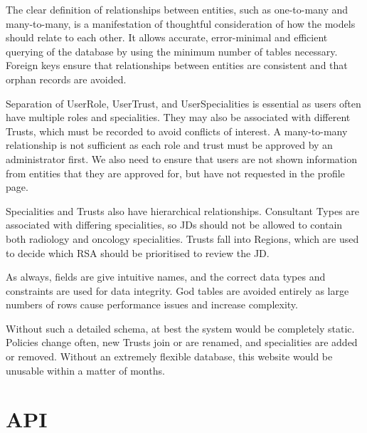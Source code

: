 The clear definition of relationships between entities, such as one-to-many and many-to-many, is a manifestation of thoughtful consideration of how the models should relate to each other. It allows accurate, error-minimal and efficient querying of the database by using the minimum number of tables necessary. Foreign keys ensure that relationships between entities are consistent and that orphan records are avoided.

Separation of UserRole, UserTrust, and UserSpecialities is essential as users often have multiple roles and specialities. They may also be associated with different Trusts, which must be recorded to avoid conflicts of interest. A many-to-many relationship is not sufficient as each role and trust must be approved by an administrator first. We also need to ensure that users are not shown information from entities that they are approved for, but have not requested in the profile page. 

Specialities and Trusts also have hierarchical relationships. Consultant Types are associated with differing specialities, so JDs should not be allowed to contain both radiology and oncology specialities. Trusts fall into Regions, which are used to decide which RSA should be prioritised to review the JD.

As always, fields are give intuitive names, and the correct data types and constraints are used for data integrity. God tables are avoided entirely as large numbers of rows cause performance issues and increase complexity.

Without such a detailed schema, at best the system would be completely static. Policies change often, new Trusts join or are renamed, and specialities are added or removed. Without an extremely flexible database, this website would be unusable within a matter of months.

\section{API}
